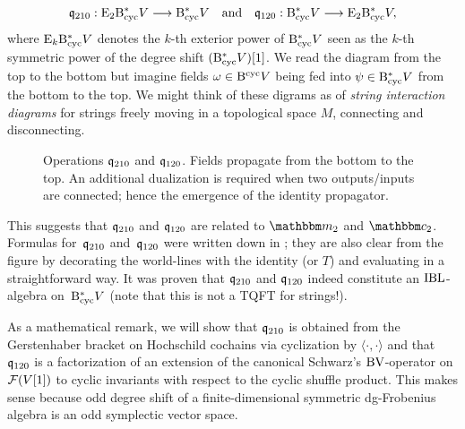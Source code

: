 \documentclass[\MainFolder/Text.tex]{subfiles}
\begin{document}
\[ \mathfrak{q}_{210}: \mathrm{E}_2 \mathrm{B}_{\mathrm{cyc}}^* V \longrightarrow \mathrm{B}_{\mathrm{cyc}}^* V \quad\text{and}\quad \mathfrak{q}_{120}: \mathrm{B}_{\mathrm{cyc}}^* V \longrightarrow \mathrm{E}_2\mathrm{B}_{\mathrm{cyc}}^* V,
\]
where $\mathrm{E}_k \mathrm{B}_{\mathrm{cyc}}^* V$ denotes the $k$-th exterior power of $\mathrm{B}_{\mathrm{cyc}}^* V$ seen as the $k$-th symmetric power of the degree shift $(\mathrm{B}_{\mathrm{cyc}}^* V)[1]$.
We read the diagram from the top to the bottom but imagine fields $\omega\in \mathrm{B}^{\mathrm{cyc}} V$ being fed into $\psi\in \mathrm{B}_{\mathrm{cyc}}^* V$ from the bottom to the top.
We might think of these digrams as of \emph{string interaction diagrams} for strings freely moving in a topological space $M$, connecting and disconnecting.
\begin{figure}[t]
\centering
 
 \caption[Operations $\OPQ_{210}$ and $\OPQ_{120}$.]{Operations $\OPQ_{210}$ and $\OPQ_{120}$. Fields propagate from the bottom to the top. An additional dualization is required when two outputs/inputs are connected; hence the emergence of the identity propagator.}
 \label{Fig:OpCoOpDiag}
\end{figure}
%
This suggests that $\OPQ_{210}$ and $\OPQ_{120}$ are related to $\StringOp_2$ and $\StringCoOp_2$.
Formulas for~$\OPQ_{210}$ and~$\OPQ_{120}$ were written down in \cite{Cieliebak2015}; they are also clear from the figure by decorating the world-lines with the identity (or $T$) and evaluating in a straightforward way.
It was proven that $\OPQ_{210}$ and $\OPQ_{120}$ indeed constitute an $\mathrm{IBL}$-algebra on~$\mathrm{B}_{\mathrm{cyc}}^* V$ (note that this is not a TQFT for strings!). 

As a mathematical remark, we will show that $\OPQ_{210}$ is obtained from the Gerstenhaber bracket on Hochschild cochains via cyclization by $\langle\cdot,\cdot\rangle$ and that $\OPQ_{120}$ is a factorization of an extension of the canonical Schwarz's $\mathrm{BV}$-operator on $\mathcal{F}(V[1])$ to cyclic invariants with respect to the cyclic shuffle product.
This makes sense because odd degree shift of a finite-dimensional symmetric dg-Frobenius algebra is an odd symplectic vector space. 
\end{document}

